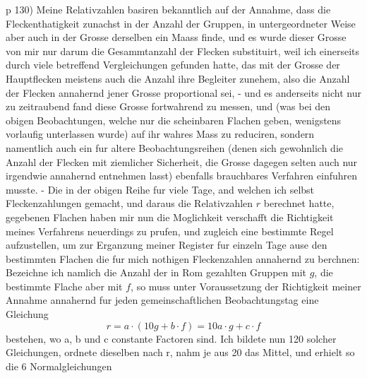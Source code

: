 \documentclass[12pt]{article}
\begin{document}
p 130) Meine Relativzahlen basiren bekanntlich auf der Annahme, dass die Fleckenthatigkeit zunachst in der Anzahl der Gruppen, in untergeordneter Weise aber auch in der Grosse derselben ein Maass finde, und es wurde dieser Grosse von mir nur darum die Gesammtanzahl der Flecken substituirt, weil ich einerseits durch viele betreffend Vergleichungen gefunden hatte, das mit der Grosse der Hauptflecken meistens auch die Anzahl ihre Begleiter zunehem, also die Anzahl der Flecken annahernd jener Grosse proportional sei, - und es anderseits nicht nur zu zeitraubend fand diese Grosse fortwahrend zu messen, und (was bei den obigen Beobachtungen, welche nur die scheinbaren Flachen geben, wenigstens vorlaufig unterlassen wurde) auf ihr wahres Mass zu reduciren, sondern namentlich auch ein fur altere Beobachtungsreihen (denen sich gewohnlich die Anzahl der Flecken mit ziemlicher Sicherheit, die Grosse dagegen selten auch nur irgendwie annahernd entnehmen lasst) ebenfalls brauchbares Verfahren einfuhren musste. - Die in der obigen Reihe fur viele Tage, and welchen ich selbst Fleckenzahlungen gemacht, und daraus die Relativzahlen $r$ berechnet hatte, gegebenen Flachen haben mir nun die Moglichkeit verschafft die Richtigkeit meines Verfahrens neuerdings zu prufen, und zugleich eine bestimmte Regel aufzustellen, um zur Erganzung meiner Register fur einzeln Tage ause den bestimmten Flachen die fur mich nothigen Fleckenzahlen annahernd zu berchnen: Bezeichne ich namlich die Anzahl der in Rom gezahlten Gruppen mit $g$, die bestimmte Flache aber mit $f$, so muss unter Voraussetzung der Richtigkeit meiner Annahme annahernd fur jeden gemeinschaftlichen Beobachtungstag eine Gleichung
$$r = a\cdot (10 g + b \cdot f) = 10 a \cdot g + c \cdot f$$
bestehen, wo a, b und c constante Factoren sind. Ich bildete nun 120 solcher Gleichungen, ordnete dieselben nach r, nahm je aus 20 das Mittel, und erhielt so die 6 Normalgleichungen \\
\end{document}
